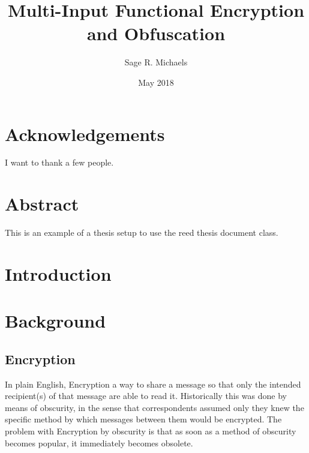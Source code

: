 \documentclass[12pt,twoside]{reedthesis}
\title{Multi-Input Functional Encryption and Obfuscation}
\author{Sage R. Michaels}
\date{May 2018}
\begin{document}
  \maketitle
  \frontmatter %
  \pagestyle{empty} %

    \chapter*{Acknowledgements}
	I want to thank a few people.

    \chapter*{Abstract}
	This is an example of a thesis setup to use the reed thesis document class.
	

    \tableofcontents
    
 
  \mainmatter %
  \pagestyle{fancyplain} %
    
     \chapter*{Introduction}
	        
    
    \chapter{Background}
    \section{Encryption}
    In plain English, Encryption a way to share a message so that only the intended recipient(s) of
    that message are able to read it. Historically this was done by means of obscurity, in the sense that correspondents
    assumed only they knew the specific method by which messages between them would be encrypted. The problem
    with Encryption by obscurity is that as soon as a method of obscurity becomes popular, it immediately becomes
    obsolete.
\end{document}

